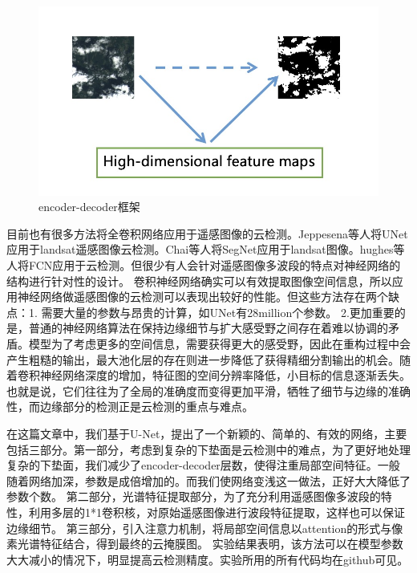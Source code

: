 \documentclass[UTF8]{ctexart}
\begin{document}
\begin{figure}[H]
    \centering
    \includegraphics[scale=0.3]{../pic/en-decoder.jpg}
    \caption{encoder-decoder框架}
    \label{fig:en-decoder}
\end{figure}


目前也有很多方法将全卷积网络应用于遥感图像的云检测。Jeppesena等人\cite{jeppesen2019cloud}将UNet应用于landsat遥感图像云检测。Chai等人\cite{chai2019cloud}将SegNet应用于landsat图像。hughes等人\cite{hughes2019high}将FCN应用于云检测。但很少有人会针对遥感图像多波段的特点对神经网络的结构进行针对性的设计。
卷积神经网络确实可以有效提取图像空间信息，所以应用神经网络做遥感图像的云检测可以表现出较好的性能。但这些方法存在两个缺点：1. 需要大量的参数与昂贵的计算，如UNet有28million个参数。 2.更加重要的是，普通的神经网络算法在保持边缘细节与扩大感受野之间存在着难以协调的矛盾。模型为了考虑更多的空间信息，需要获得更大的感受野，因此在重构过程中会产生粗糙的输出，最大池化层的存在则进一步降低了获得精细分割输出的机会。随着卷积神经网络深度的增加，特征图的空间分辨率降低，小目标的信息逐渐丢失。也就是说，它们往往为了全局的准确度而变得更加平滑，牺牲了细节与边缘的准确性，而边缘部分的检测正是云检测的重点与难点。

在这篇文章中，我们基于U-Net，提出了一个新颖的、简单的、有效的网络，主要包括三部分。第一部分，考虑到复杂的下垫面是云检测中的难点，为了更好地处理复杂的下垫面，我们减少了encoder-decoder层数，使得注重局部空间特征。一般随着网络加深，参数是成倍增加的。而我们使网络变浅这一做法，正好大大降低了参数个数。
第二部分，光谱特征提取部分，为了充分利用遥感图像多波段的特性，利用多层的1*1卷积核，对原始遥感图像进行波段特征提取，这样也可以保证边缘细节。
第三部分，引入注意力机制，将局部空间信息以attention的形式与像素光谱特征结合，得到最终的云掩膜图。
实验结果表明，该方法可以在模型参数大大减小的情况下，明显提高云检测精度。实验所用的所有代码均在github可见。
\end{document}

